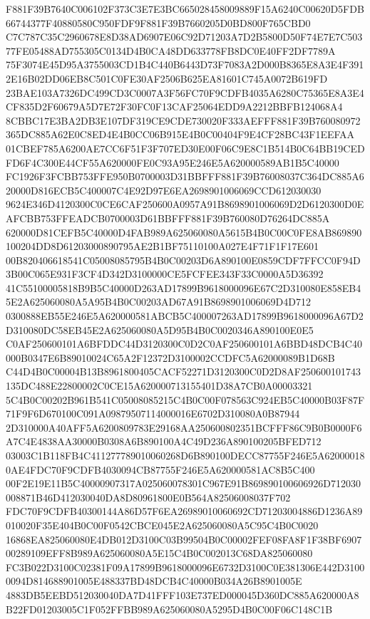 \documentclass[UTF8,fontset=fandol,zihao=-4,a4paper]{ctexart}
\begin{document}
{{F881F39B7640C006102F373C3E7E3BC665028458009889F15A6240C00620D5FDB66744377F40880580C950FDF9F881F39B7660205D0BD800F765CBD0
C7C787C35C2960678E8D38AD6907E06C92D71203A7D2B5800D50F74E7E7C50377FE05488AD755305C0134D4B0CA48DD633778FB8DC0E40FF2DF7789A
75F3074E45D95A3755003CD1B4C440B6443D73F7083A2D000B8365E8A3E4F3912E16B02DD06EB8C501C0FE30AF2506B625EA81601C745A0072B619FD
23BAE103A7326DC499CD3C0007A3F56FC70F9CDFB4035A6280C75365E8A3E4CF835D2F60679A5D7E72F30FC0F13CAF25064EDD9A2212BBFB124068A4
8CBBC17E3BA2DB3E107DF319CE9CDE730020F333AEFFF881F39B760080972365DC885A62E0C8ED4E4B0CC06B915E4B0C00404F9E4CF28BC43F1EEFAA
01CBEF785A6200AE7CC6F51F3F707ED30E00F06C9E8C1B514B0C64BB19CEDFD6F4C300E44CF55A620000FE0C93A95E246E5A620000589AB1B5C40000
FC1926F3FCBB753FFE950B0700003D31BBFFF881F39B76008037C364DC885A620000D816ECB5C400007C4E92D97E6EA2698901006069CCD612030030
9624E346D4120300C0CE6CAF250600A0957A91B8698901006069D2D6120300D0EAFCBB753FFEADCB0700003D61BBFFF881F39B760080D76264DC885A
620000D81CEFB5C40000D4FAB989A625060080A5615B4B0C00C0FE8AB869890100204DD8D61203000890795AE2B1BF75110100A027E4F71F1F17E601
00B820406618541C05008085795B4B0C00203D6A890100E0859CDF7FFCC0F94D3B00C065E931F3CF4D342D3100000CE5FCFEE343F33C0000A5D36392
41C55100005818B9B5C40000D263AD17899B9618000096E67C2D310080E858EB45E2A625060080A5A95B4B0C00203AD67A91B8698901006069D4D712
0300888EB55E246E5A620000581ABCB5C400007263AD17899B9618000096A67D2D310080DC58EB45E2A625060080A5D95B4B0C0020346A890100E0E5
C0AF250600101A6BFDDC44D3120300C0D2C0AF250600101A6BBD48DCB4C40000B0347E6B89010024C65A2F12372D3100002CCDFC5A62000089B1D68B
C44D4B0C00004B13B8961800405CACF52271D3120300C0D2D8AF250600101743135DC488E22800002C0CE15A620000713155401D38A7CB0A00003321
5C4B0C00202B961B541C05008085215C4B0C00F078563C924EB5C40000B03F87F71F9F6D670100C091A09879507114000016E6702D310080A0B87944
2D310000A40AFF5A6200809783E29168AA250600802351BCFFF86C9B0B0000F6A7C4E4838AA30000B0308A6B890100A4C49D236A890100205BFED712
03003C1B118FB4C411277789010060268D6B890100DECC87755F246E5A620000180AE4FDC70F9CDFB4030094CB87755F246E5A620000581AC8B5C400
00F2E19E11B5C40000907317A025060078301C967E91B869890100606926D712030008871B46D412030040DA8D80961800E0B564A82506008037F702
FDC70F9CDFB40300144A86D57F6EA26989010060692CD71203004886D1236A89010020F35E404B0C00F0542CBCE045E2A625060080A5C95C4B0C0020
16868EA825060080E4DB012D3100C03B99504B0C00002FEF08FA8F1F38BF690700289109EFF8B989A625060080A5E15C4B0C002013C68DA825060080
FC3B022D3100C02381F09A17899B9618000096E6732D3100C0E381306E442D31000094D814688901005E488337BD48DCB4C40000B034A26B8901005E
4883DB5EEBD512030040DA7D41FFF103E737ED000045D360DC885A620000A8B22FD01203005C1F052FFBB989A625060080A5295D4B0C00F06C148C1B
}}
\end{document}
